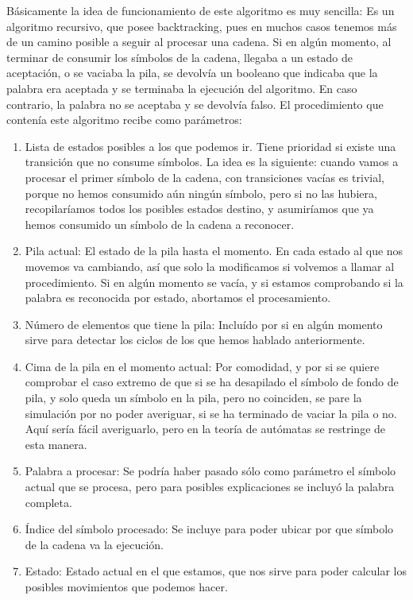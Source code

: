 \documentclass[12pt,a4paper,spanish]{book}
\begin{document}
B\'asicamente la idea de funcionamiento de este algoritmo es muy sencilla: Es un algoritmo recursivo, que posee backtracking, pues en muchos casos tenemos m\'as de un camino posible a seguir al procesar una cadena. Si en alg\'un momento, al terminar de consumir los s\'imbolos de la cadena, llegaba a un estado de aceptaci\'on, o se vaciaba la pila, se devolv\'ia un booleano que indicaba que la palabra era aceptada y se terminaba la ejecuci\'on del algoritmo. En caso contrario, la palabra no se aceptaba y se devolv\'ia falso.
El procedimiento que conten\'ia este algoritmo recibe como par\'ametros:
\begin{enumerate}
\item Lista de estados posibles a los que podemos ir. Tiene prioridad si existe una transici\'on que no consume s\'imbolos. La idea es la siguiente: cuando vamos a procesar el primer s\'imbolo de la cadena, con transiciones vac\'ias es trivial, porque no hemos consumido a\'un ning\'un s\'imbolo, pero si no las hubiera, recopilar\'iamos todos los posibles estados destino, y asumir\'iamos que ya hemos consumido un s\'imbolo de la cadena a reconocer.
\item Pila actual: El estado de la pila hasta el momento. En cada estado al que nos movemos va cambiando, as\'i que solo la modificamos si volvemos a llamar al procedimiento. Si en alg\'un momento se vac\'ia, y si estamos comprobando si la palabra es reconocida por estado, abortamos el procesamiento.
\item N\'umero de elementos que tiene la pila: Inclu\'ido por si en alg\'un momento sirve para detectar los ciclos de los que hemos hablado anteriormente.
\item Cima de la pila en el momento actual: Por comodidad, y por si se quiere comprobar el caso extremo de que si se ha desapilado el s\'imbolo de fondo de pila, y solo queda un s\'imbolo en la pila, pero no coinciden, se pare la simulaci\'on por no poder averiguar, si se ha terminado de vaciar la pila o no. Aqu\'i ser\'ia f\'acil averiguarlo, pero en la teor\'ia de aut\'omatas se restringe de esta manera.

\item Palabra a procesar: Se podr\'ia haber pasado s\'olo como par\'ametro el s\'imbolo actual que se procesa, pero para posibles explicaciones se incluy\'o la palabra completa.
\item \'Indice del s\'imbolo procesado: Se incluye para poder ubicar por que s\'imbolo de la cadena va la ejecuci\'on.
\item Estado: Estado actual en el que estamos, que nos sirve para poder calcular los posibles movimientos que podemos hacer.
\end{enumerate}
\end{document}
